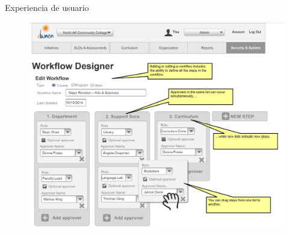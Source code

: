 \documentclass[10pt,xcolor=table ]{beamer}
\begin{document}
\begin{frame}{Experiencia de usuario}
	\begin{figure}[H]
		\centering
		\includegraphics[scale=0.24]{../Figuras/mockups/el_curr_1}
	\end{figure}
\end{frame}
\end{document}

